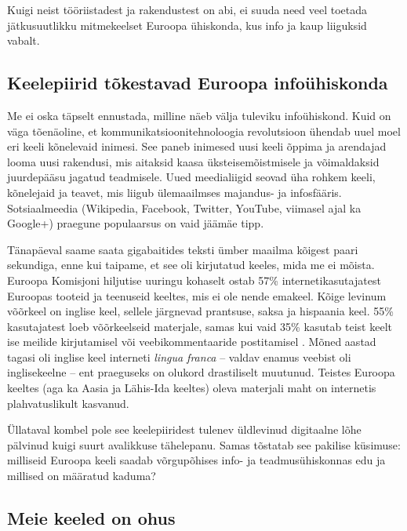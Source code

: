 \begin{multicols}{2}
Kuigi neist tööriistadest ja rakendustest on abi, ei suuda need veel toetada jätku\-suutlikku mitmekeelset Euroopa ühiskonda, kus info ja kaup liiguksid vabalt.

\subsection{Keelepiirid tõkestavad Euroopa infoühiskonda}
  
Me ei oska täpselt ennustada, milline näeb välja tuleviku infoühiskond.  Kuid on väga tõenäoline, et kommunikatsioonitehno\-loogia revolutsioon ühendab uuel moel eri keeli kõnelevaid inimesi.  See paneb ini\-mesed uusi keeli õppima ja arendajad looma uusi rakendusi, mis aitaksid kaasa üks\-teisemõistmisele ja võimaldaksid juurdepääsu jagatud teadmisele.  Uued meedia\-liigid seovad üha rohkem keeli, kõnelejaid ja teavet, mis liigub ülemaailmses majandus- ja infosfääris.  Sotsiaalmeedia (Wikipedia, Facebook, Twitter, YouTube, viimasel ajal ka Google+) praegune popu\-laarsus on vaid jäämäe tipp.


Tänapäeval saame saata gigabaitides teks\-ti ümber maailma kõigest paari sekundiga, enne kui taipame, et see oli kirjutatud keeles, mida me ei mõista.  Euroopa Komisjoni hiljutise uuringu kohaselt ostab 57\% internetikasutajatest Euroopas tooteid ja teenuseid keeltes, mis ei ole nende emakeel.  Kõige levinum võõrkeel on inglise keel, sellele järgnevad prantsuse, saksa ja hispaania keel.  55\% kasuta\-ja\-test loeb võõrkeelseid materjale, samas kui vaid 35\% kasutab teist keelt ise meilide kirjutamisel või veebikommentaaride postitamisel \cite{EC1}.  Mõned aastad tagasi oli ing\-lise keel interneti \textit{lingua franca} -- valdav enamus veebist oli inglisekeelne -- ent praeguseks on olukord drastiliselt muutunud.  Teistes Euroopa keeltes (aga ka Aasia ja Lähis-Ida keeltes) oleva materjali maht on internetis plahvatuslikult kasvanud.

Üllataval kombel pole see keelepiiridest tulenev üldlevinud digitaalne lõhe pälvinud kuigi suurt avalikkuse tähelepanu. Samas tõstatab see pakilise küsimuse: milliseid Euroopa keeli saadab võrgupõhises info- ja teadmusühiskonnas edu ja millised on määratud kaduma?


\subsection{Meie keeled on ohus}


\end{multicols}
